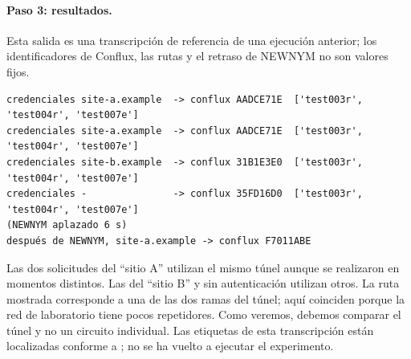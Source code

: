 \paragraph{Paso 3: resultados.} Esta salida es una transcripción de referencia de una ejecución anterior; los identificadores de Conflux, las rutas y el retraso de NEWNYM no son valores fijos.
\begin{lstlisting}[numbers=none]
credenciales site-a.example  -> conflux AADCE71E  ['test003r', 'test004r', 'test007e']
credenciales site-a.example  -> conflux AADCE71E  ['test003r', 'test004r', 'test007e']
credenciales site-b.example  -> conflux 31B1E3E0  ['test003r', 'test004r', 'test007e']
credenciales -               -> conflux 35FD16D0  ['test003r', 'test004r', 'test007e']
(NEWNYM aplazado 6 s)
después de NEWNYM, site-a.example -> conflux F7011ABE
\end{lstlisting}

Las dos solicitudes del \enquote{sitio A} utilizan el mismo túnel aunque se realizaron en momentos distintos. Las del \enquote{sitio B} y sin autenticación utilizan otros. La ruta mostrada corresponde a una de las dos ramas del túnel; aquí coinciden porque la red de laboratorio tiene pocos repetidores. Como veremos, debemos comparar el túnel y no un circuito individual. Las etiquetas de esta transcripción están localizadas conforme a ; no se ha vuelto a ejecutar el experimento.

